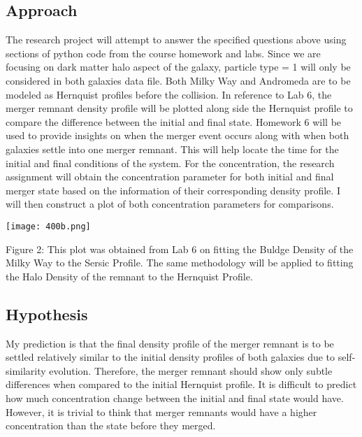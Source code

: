 \documentclass{article}
\begin{document}
\subsection{Approach}
The research project will attempt to answer the specified questions above using sections of python code from the course homework and labs. Since we are focusing on dark matter halo aspect of the galaxy, particle type = 1 will only be considered in both galaxies data file. Both Milky Way and Andromeda are to be modeled as Hernquist profiles before the collision. In reference to Lab 6, the merger remnant density profile will be plotted along side the Hernquist profile to compare the difference between the initial and final state. Homework 6 will be used to provide insights on when the merger event occurs along with when both galaxies settle into one merger remnant. This will help locate the time for the initial and final conditions of the system. For the concentration, the research assignment will obtain the concentration parameter for both initial and final merger state based on the information of their corresponding density profile. I will then construct a plot of both concentration parameters for comparisons.
\begin{center}
\texttt{[image: 400b.png]} \par
Figure 2: This plot was obtained from Lab 6 on fitting the Buldge Density of the Milky Way to the Sersic Profile. The same methodology will be applied to fitting the Halo Density of the remnant to the Hernquist Profile.
\end{center}

\subsection{Hypothesis}
My prediction is that the final density profile of the merger remnant is to be settled relatively similar to the initial density profiles of both galaxies due to self-similarity evolution. Therefore, the merger remnant should show only subtle differences when compared to the initial Hernquist profile. It is difficult to predict how much concentration change between the initial and final state would have. However, it is trivial to think that merger remnants would have a higher concentration than the state before they merged.



\end{document}
